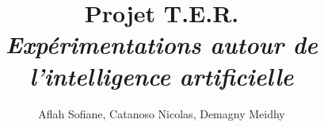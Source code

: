 \title{Projet T.E.R. \\\emph{Expérimentations autour de l'intelligence artificielle} }
\author{Aflah Sofiane, Catanoso Nicolas, Demagny Meidhy}

\pagebreak

